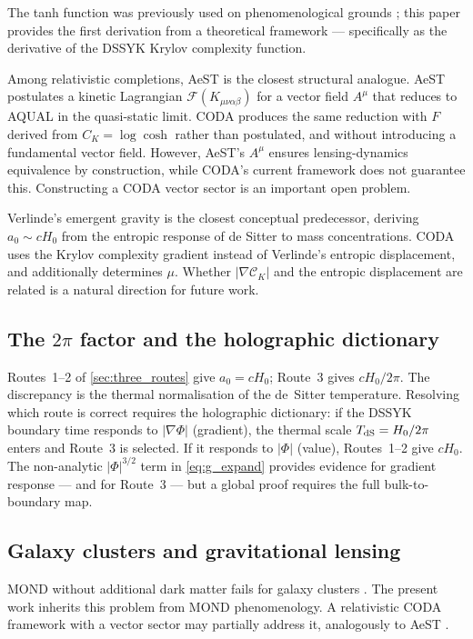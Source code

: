 \documentclass[a4paper,11pt]{article}
\newcommand{\CK}{\mathcal{C}_K}                     %
\newcommand{\az}{a_0}                                %
\newcommand{\TdS}{T_{\rm dS}}                        %
\begin{document}
The tanh function was previously used on phenomenological grounds
\cite{Zhao:2006,Gentile:2011}; this paper provides the first derivation
from a theoretical framework --- specifically as the derivative of the
DSSYK Krylov complexity function.

Among relativistic completions, AeST \cite{Skordis:2021} is the closest
structural analogue.  AeST postulates a kinetic Lagrangian
$\mathcal{F}(K_{\mu\nu\alpha\beta})$ for a vector field $A^\mu$ that
reduces to AQUAL in the quasi-static limit.  CODA produces the same
reduction with $F$ derived from $C_K=\log\cosh$ rather than postulated,
and without introducing a fundamental vector field.  However, AeST's
$A^\mu$ ensures lensing-dynamics equivalence by construction, while
CODA's current framework does not guarantee this.  Constructing a CODA
vector sector is an important open problem.

Verlinde's emergent gravity \cite{Verlinde:2017} is the closest conceptual
predecessor, deriving $\az\sim cH_0$ from the entropic response of de
Sitter to mass concentrations.  CODA uses the Krylov complexity gradient
instead of Verlinde's entropic displacement, and additionally determines
$\mu$.  Whether $|\nabla\CK|$ and the entropic displacement are related
is a natural direction for future work.

\subsection{The $2\pi$ factor and the holographic dictionary}
\label{sec:2pi}

Routes~1--2 of \cref{sec:three_routes} give $\az=cH_0$; Route~3 gives
$cH_0/2\pi$.  The discrepancy is the thermal normalisation of the
de~Sitter temperature.  Resolving which route is correct requires the
holographic dictionary: if the DSSYK boundary time responds to
$|\nabla\Phi|$ (gradient), the thermal scale $\TdS=H_0/2\pi$ enters and
Route~3 is selected.  If it responds to $|\Phi|$ (value), Routes~1--2
give $cH_0$.  The non-analytic $|\Phi|^{3/2}$ term in \cref{eq:g_expand}
provides evidence for gradient response --- and for Route~3 --- but a
global proof requires the full bulk-to-boundary map.

\subsection{Galaxy clusters and gravitational lensing}

MOND without additional dark matter fails for galaxy clusters
\cite{Angus:2006}.  The present work inherits this problem from MOND
phenomenology.  A relativistic CODA framework with a vector sector may
partially address it, analogously to AeST \cite{Skordis:2021}.
\end{document}
